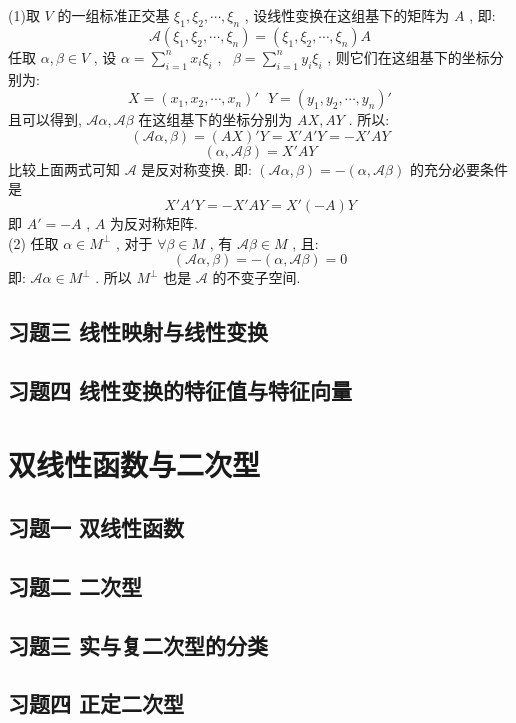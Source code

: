 \documentclass[11pt,a4paper,openany,oneside]{book}
\begin{document}
(1)取 $ V $ 的一组标准正交基 $ \xi_1, \xi_2, \cdots, \xi_n $ , 设线性变换在这组基下的矩阵为 $ A $ , 即:
 $$  \mathcal{A}(\xi_1, \xi_2, \cdots, \xi_n) = (\xi_1, \xi_2, \cdots, \xi_n)A  $$ 
任取 $ \alpha, \beta \in V $ , 设 $ \alpha = \sum\limits_{i=1}^n x_i\xi_i $ , \  $ \beta=\sum\limits_{i=1}^n y_i\xi_i $ , 则它们在这组基下的坐标分别为:
 $$  X = (x_1, x_2, \cdots, x_n)' \ \ \ Y = (y_1, y_2, \cdots, y_n)'  $$ 
且可以得到,  $ \mathcal{A}\alpha, \mathcal{A}\beta $ 在这组基下的坐标分别为 $ AX, AY $ . 所以:
 $$  (\mathcal{A}\alpha, \beta) = (AX)'Y = X'A'Y = -X'AY  $$ 
 $$  (\alpha, \mathcal{A}\beta) = X'AY  $$ 
比较上面两式可知 $ \mathcal{A} $ 是反对称变换. 即:  $ (\mathcal{A}\alpha, \beta) = -(\alpha, \mathcal{A}\beta) $ 的充分必要条件是
 $$ X'A'Y = -X'AY = X'(-A)Y $$ 
即 $ A' = -A $ ,  $ A $ 为反对称矩阵. \\

(2) 任取 $ \alpha \in M^{\perp} $ , 对于 $ \forall \beta \in M $ , 有 $ \mathcal{A}\beta \in M $ , 且:
 $$  (\mathcal{A}\alpha, \beta) = -(\alpha, \mathcal{A}\beta) = 0  $$ 
即: $ \mathcal{A}\alpha \in M^{\perp} $ . 所以 $ M^{\perp} $ 也是 $ \mathcal{A} $ 的不变子空间.


\section{习题三 \quad 线性映射与线性变换}
\section{习题四 \quad 线性变换的特征值与特征向量}

\chapter{双线性函数与二次型}
\section{习题一 \quad 双线性函数}	
\section{习题二 \quad 二次型}
\section{习题三 \quad 实与复二次型的分类}
\section{习题四 \quad 正定二次型}
\end{document}
